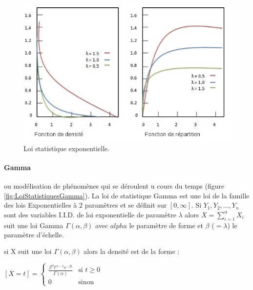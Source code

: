 \documentclass[a4paper,12pt]{report}
\theoremstyle{plain}				%
\theoremstyle{definition}				%
\begin{document}
\begin{figure}
{\centering
\includegraphics[width=\columnwidth]{loiStatExponentielle.png}
\caption{Loi statistique exponentielle.}
\label{fig:LoiStatistiquesExponentielle}
\par}
\end{figure}

\paragraph{Gamma}
ou modélisation de phénomènes qui se déroulent u cours du temps (figure \ref{fig:LoiStatistiquesGamma}). 
La loi de statistique Gamma est une loi de la famille des lois Exponentielles à 2 paramètres 
  et se définit sur $[0, \infty]$.
Si $Y_1, Y_2, \ldots, Y_n$ sont des variables I.I.D. 
  de loi exponentielle de paramètre $\lambda$ alors $X=\sum_{ i= 1}^{\alpha} X_i$  
  suit une loi Gamma $\Gamma(\alpha, \beta)$ avec 
    $alpha$ le paramètre de forme et 
    $\beta$ ($=\lambda$) le paramètre d'échelle. 
  
si X suit une loi $\Gamma(\alpha, \beta)$ alors la densité est de la forme :

  \begin{center}
  $[X=t] = \left\{
    \begin{array}{ll}
    	\frac{\beta^{\alpha} t^{\alpha-1} e^{-\beta t}}{\Gamma(\alpha)}  & 
    	\mbox{si } t \geq 0  \\
        0 & 
        \mbox{sinon}
    \end{array}
	\right.$
  \label{definitionLoiGammaDensite}
  \end{center}
   
\end{document}
